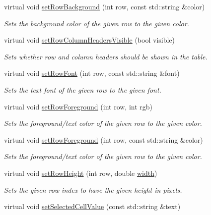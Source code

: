 \begin{DoxyCompactItemize}
virtual void \mbox{\hyperlink{classGTable_a30c7073dfeac833056ed65a8bb9a7e08}{set\+Row\+Background}} (int row, const std\+::string \&color)
\begin{DoxyCompactList}\small\item\em Sets the background color of the given row to the given color. \end{DoxyCompactList}\item 
virtual void \mbox{\hyperlink{classGTable_a0d4a1d2a58daff8c1984e31b21f93ea1}{set\+Row\+Column\+Headers\+Visible}} (bool visible)
\begin{DoxyCompactList}\small\item\em Sets whether row and column headers should be shown in the table. \end{DoxyCompactList}\item 
virtual void \mbox{\hyperlink{classGTable_adaeccb3f3fd318185b8adc644aaca949}{set\+Row\+Font}} (int row, const std\+::string \&font)
\begin{DoxyCompactList}\small\item\em Sets the text font of the given row to the given font. \end{DoxyCompactList}\item 
virtual void \mbox{\hyperlink{classGTable_abe6e1382d3d98a9479cf43ac204b0ee3}{set\+Row\+Foreground}} (int row, int rgb)
\begin{DoxyCompactList}\small\item\em Sets the foreground/text color of the given row to the given color. \end{DoxyCompactList}\item 
virtual void \mbox{\hyperlink{classGTable_a27ede8127bd8889e3f71dfe152c1684d}{set\+Row\+Foreground}} (int row, const std\+::string \&color)
\begin{DoxyCompactList}\small\item\em Sets the foreground/text color of the given row to the given color. \end{DoxyCompactList}\item 
virtual void \mbox{\hyperlink{classGTable_a815f0bed3e7a76d99b4a026808a555b3}{set\+Row\+Height}} (int row, double \mbox{\hyperlink{classGTable_ad72663daf610f2a0833a2fc3d78e4fdf}{width}})
\begin{DoxyCompactList}\small\item\em Sets the given row index to have the given height in pixels. \end{DoxyCompactList}\item 
virtual void \mbox{\hyperlink{classGTable_a3120b24ea5aaa17d8a7192742c00bcfb}{set\+Selected\+Cell\+Value}} (const std\+::string \&text)

\end{DoxyCompactItemize}
